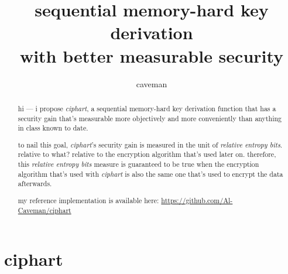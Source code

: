\documentclass[twocolumn]{article}
\author{caveman}
\title{sequential memory-hard key derivation \\
with better measurable security}
\begin{document}
\maketitle
\begin{abstract}
hi --- i propose \emph{ciphart}, a sequential memory-hard key derivation
function that has a security gain that's measurable more objectively and
more conveniently than anything in class known to date.

to nail this goal, \emph{ciphart}'s security gain is measured in the unit
of \emph{relative entropy bits}.  relative to what?  relative to the
encryption algorithm that's used later on.  therefore, this \emph{relative
entropy bits} measure is guaranteed to be true when the encryption
algorithm that's used with \emph{ciphart} is also the same one that's used
to encrypt the data afterwards.

my reference implementation is available here: 
\url{https://github.com/Al-Caveman/ciphart}
\end{abstract}

\tableofcontents

\section{ciphart}
\end{document}
